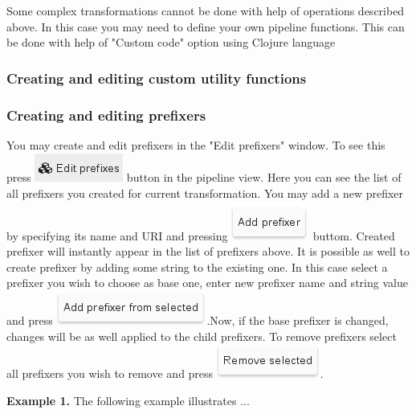 \documentclass[USenglish]{article}
\begin{document}
Some complex transformations cannot be done with help of operations described above. In this case you may need to define your own pipeline functions. This can be done with help of "Custom code" option using Clojure language
\subsubsection{Creating and editing custom utility functions \label{customFunc}}
\subsubsection{Creating and editing prefixers \label{customFunc}}

You may create and edit prefixers in the "Edit prefixers" window. To see this press {\includegraphics[scale=0.5]{editprefixers.png}} button in the pipeline view. Here you can see the list of all prefixers you created for current transformation. You may add a new prefixer by specifying its name and URI and pressing {\includegraphics[scale=0.5]{addprefixer.png}} buttom. Created prefixer will instantly appear in the list of prefixers above. It is possible as well to create prefixer by adding some string to the existing one. In this case select a prefixer you wish to choose as base one, enter new prefixer name and string value and press  {\includegraphics[scale=0.5]{addprefixerfrom.png}}.Now, if the base prefixer is changed, changes will be as well applied to the child prefixers. To remove prefixers select all prefixers you wish to remove and press  {\includegraphics[scale=0.5]{removeprefixers.png}}.


\begin{mdframed}[hidealllines=true,backgroundcolor=gray!10]
\textbf{Example 1.}
The following example illustrates ...
\end{mdframed}
\end{document}
